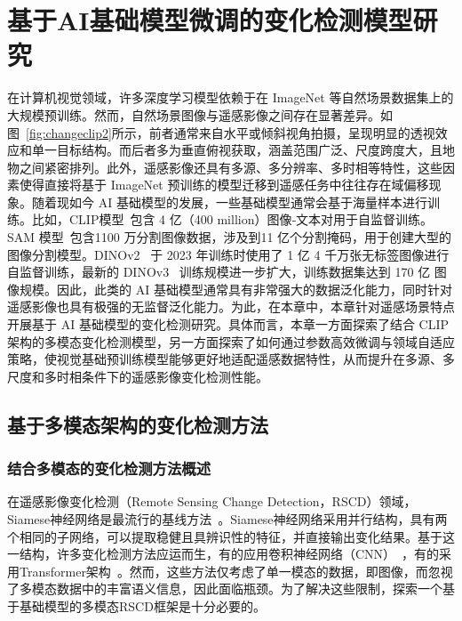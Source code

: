   
\chapter{基于AI基础模型微调的变化检测模型研究}

在计算机视觉领域，许多深度学习模型依赖于在 ImageNet 等自然场景数据集上的大规模预训练。然而，自然场景图像与遥感影像之间存在显著差异。如图~\ref{fig:changeclip2}所示，前者通常来自水平或倾斜视角拍摄，呈现明显的透视效应和单一目标结构。而后者多为垂直俯视获取，涵盖范围广泛、尺度跨度大，且地物之间紧密排列。此外，遥感影像还具有多源、多分辨率、多时相等特性，这些因素使得直接将基于 ImageNet 预训练的模型迁移到遥感任务中往往存在域偏移现象。随着现如今 AI 基础模型的发展，一些基础模型通常会基于海量样本进行训练。比如，CLIP模型~\cite{Radford2021LearningTV}包含 4 亿（400 million）图像‑文本对用于自监督训练。SAM 模型~\cite{Kirillov2023SegmentA}包含1100 万分割图像数据，涉及到11 亿个分割掩码，用于创建大型的图像分割模型。DINOv2~\cite{Oquab2023DINOv2LR} 于 2023 年训练时使用了 1 亿 4 千万张无标签图像进行自监督训练，最新的 DINOv3~\cite{simeoni2025dinov3} 训练规模进一步扩大，训练数据集达到 170 亿 图像规模。因此，此类的 AI 基础模型通常具有非常强大的数据泛化能力，同时针对遥感影像也具有极强的无监督泛化能力。为此，在本章中，本章针对遥感场景特点开展基于 AI 基础模型的变化检测研究。具体而言，本章一方面探索了结合 CLIP 架构的多模态变化检测模型，另一方面探索了如何通过参数高效微调与领域自适应策略，使视觉基础预训练模型能够更好地适配遥感数据特性，从而提升在多源、多尺度和多时相条件下的遥感影像变化检测性能。

\section{基于多模态架构的变化检测方法}
\subsection{结合多模态的变化检测方法概述}

在遥感影像变化检测（Remote Sensing Change Detection，RSCD）领域，Siamese神经网络是最流行的基线方法~\cite{Koch2015SiameseNN, Wang2022AnES}。Siamese神经网络采用并行结构，具有两个相同的子网络，可以提取稳健且具辨识性的特征，并直接输出变化结果。基于这一结构，许多变化检测方法应运而生，有的应用卷积神经网络（CNN）~\cite{chen2023continuous, Tian2022LargescaleDL, zhu_land-useland-cover_2022-1}，有的采用Transformer架构~\cite{chen_remote_2022, Li2022TransUNetCDAH, Liu2022RemoteSI}。然而，这些方法仅考虑了单一模态的数据，即图像，而忽视了多模态数据中的丰富语义信息，因此面临瓶颈。为了解决这些限制，探索一个基于基础模型的多模态RSCD框架是十分必要的。

